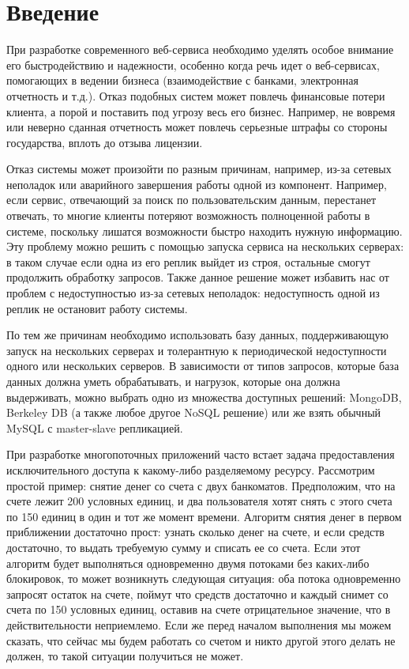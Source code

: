\section{Введение}

При разработке современного веб-сервиса необходимо уделять особое внимание его быстродействию и надежности, особенно когда речь идет о веб-сервисах, помогающих в ведении бизнеса (взаимодействие с банками, электронная отчетность и т.д.). Отказ подобных систем может повлечь финансовые потери клиента, а порой и поставить под угрозу весь его бизнес. Например, не вовремя или неверно сданная отчетность может повлечь серьезные штрафы со стороны государства, вплоть до отзыва лицензии.

Отказ системы может произойти по разным причинам, например, из-за сетевых неполадок или аварийного завершения работы одной из компонент. Например, если сервис, отвечающий за поиск по пользовательским данным, перестанет отвечать, то многие клиенты потеряют возможность полноценной работы в системе, поскольку лишатся возможности быстро находить нужную информацию. Эту проблему можно решить с помощью запуска сервиса на нескольких серверах: в таком случае если одна из его реплик выйдет из строя, остальные смогут продолжить обработку запросов. Также данное решение может избавить нас от проблем с недоступностью из-за сетевых неполадок: недоступность одной из реплик не остановит работу системы.

По тем же причинам необходимо использовать базу данных, поддерживающую запуск на нескольких серверах и толерантную к периодической недоступности одного или нескольких серверов. В зависимости от типов запросов, которые база данных должна уметь обрабатывать, и нагрузок, которые она должна выдерживать, можно выбрать одно из множества доступных решений: MongoDB, Berkeley DB (а также любое другое NoSQL решение) или же взять обычный MySQL с master-slave репликацией.

При разработке многопоточных приложений часто встает задача предоставления исключительного доступа к какому-либо разделяемому ресурсу. Рассмотрим простой пример: снятие денег со счета с двух банкоматов. Предположим, что на счете лежит 200 условных единиц, и два пользователя хотят снять с этого счета по 150 единиц в один и тот же момент времени. Алгоритм снятия денег в первом приближении достаточно прост: узнать сколько денег на счете, и если средств достаточно, то выдать требуемую сумму и списать ее со счета. Если этот алгоритм будет выполняться одновременно двумя потоками без каких-либо блокировок, то может возникнуть следующая ситуация: оба потока одновременно запросят остаток на счете, поймут что средств достаточно и каждый снимет со счета по 150 условных единиц, оставив на счете отрицательное значение, что в действительности неприемлемо. Если же перед началом выполнения мы можем сказать, что сейчас мы будем работать со счетом и никто другой этого делать не должен, то такой ситуации получиться не может.

